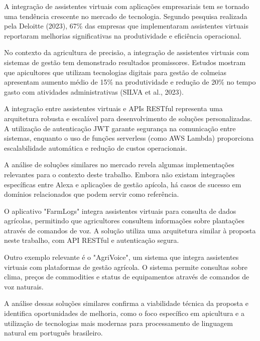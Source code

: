 
A integração de assistentes virtuais com aplicações empresariais tem se tornado uma tendência crescente no mercado de tecnologia. Segundo pesquisa realizada pela Deloitte (2023), 67\% das empresas que implementaram assistentes virtuais reportaram melhorias significativas na produtividade e eficiência operacional.

No contexto da agricultura de precisão, a integração de assistentes virtuais com sistemas de gestão tem demonstrado resultados promissores. Estudos mostram que apicultores que utilizam tecnologias digitais para gestão de colmeias apresentam aumento médio de 15\% na produtividade e redução de 20\% no tempo gasto com atividades administrativas (SILVA et al., 2023).

A integração entre assistentes virtuais e APIs RESTful representa uma arquitetura robusta e escalável para desenvolvimento de soluções personalizadas. A utilização de autenticação JWT garante segurança na comunicação entre sistemas, enquanto o uso de funções serverless (como AWS Lambda) proporciona escalabilidade automática e redução de custos operacionais.

\label{ssec:solucoes-similares}

A análise de soluções similares no mercado revela algumas implementações relevantes para o contexto deste trabalho. Embora não existam integrações específicas entre Alexa e aplicações de gestão apícola, há casos de sucesso em domínios relacionados que podem servir como referência.

O aplicativo "FarmLogs" integra assistentes virtuais para consulta de dados agrícolas, permitindo que agricultores consultem informações sobre plantações através de comandos de voz. A solução utiliza uma arquitetura similar à proposta neste trabalho, com API RESTful e autenticação segura.

Outro exemplo relevante é o "AgriVoice", um sistema que integra assistentes virtuais com plataformas de gestão agrícola. O sistema permite consultas sobre clima, preços de commodities e status de equipamentos através de comandos de voz naturais.

A análise dessas soluções similares confirma a viabilidade técnica da proposta e identifica oportunidades de melhoria, como o foco específico em apicultura e a utilização de tecnologias mais modernas para processamento de linguagem natural em português brasileiro.

